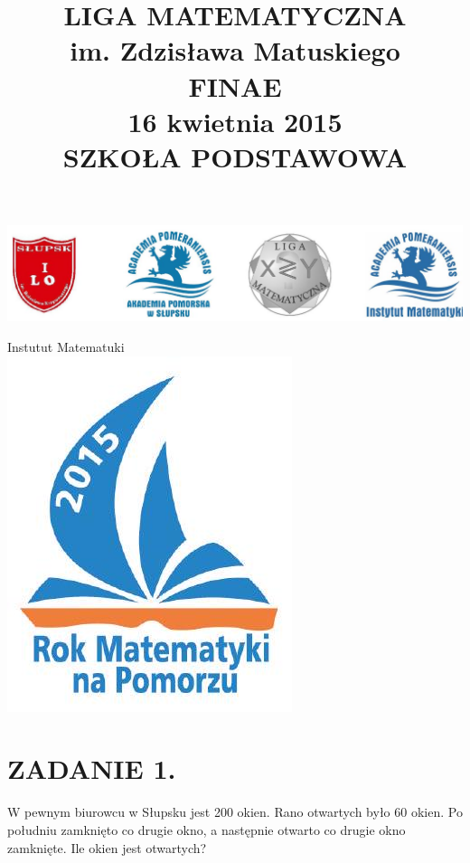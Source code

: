 \documentclass[10pt]{article}
\title{LIGA MATEMATYCZNA \\
 im. Zdzisława Matuskiego \\
 FINAE \\
 16 kwietnia 2015 \\
 SZKOŁA PODSTAWOWA }
\author{}
\date{}
\begin{document}
\maketitle
\begin{center}
\includegraphics[max width=\textwidth]{2024_11_21_bf94d205a8b075ed6f54g-1(1)}
\end{center}

Instutut Matematuki\\
\includegraphics[max width=\textwidth, center]{2024_11_21_bf94d205a8b075ed6f54g-1}

\section*{ZADANIE 1.}
W pewnym biurowcu w Słupsku jest 200 okien. Rano otwartych było 60 okien. Po południu zamknięto co drugie okno, a następnie otwarto co drugie okno zamknięte. Ile okien jest otwartych?
\end{document}
